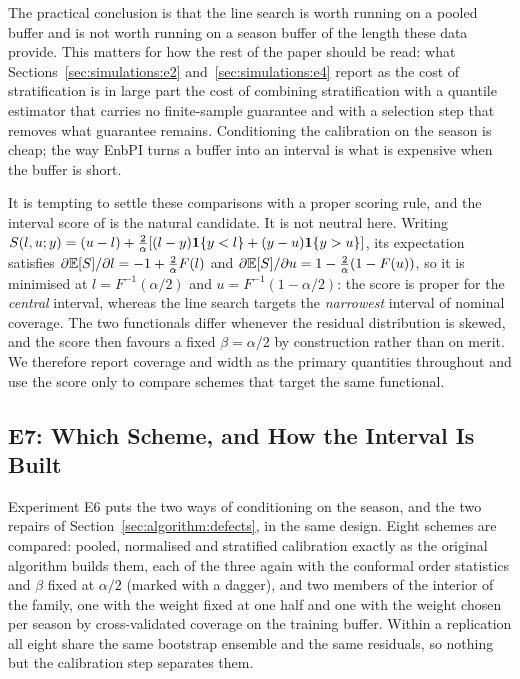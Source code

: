 The practical conclusion is that the line search is worth running on a
pooled buffer and is not worth running on a season buffer of the length
these data provide.  This matters for how the rest of the paper should be
read: what Sections~\ref{sec:simulations:e2} and~\ref{sec:simulations:e4}
report as the cost of stratification is in large part the cost of
combining stratification with a quantile estimator that carries no
finite-sample guarantee and with a selection step that removes what
guarantee remains.  Conditioning the calibration on the season is cheap;
the way EnbPI turns a buffer into an interval is what is expensive when
the buffer is short.

\begin{remark}
\label{rem:winkler}
It is tempting to settle these comparisons with a proper scoring rule, and
the interval score of \citet{winkler1972decision} is the natural
candidate.  It is not neutral here.  Writing
$S(l,u;y) = (u-l) + \tfrac{2}{\alpha}[(l-y)\mathbf{1}\!\left\{y<l\right\} + (y-u)\mathbf{1}\!\left\{y>u\right\}]$,
its expectation satisfies $\partial \mathbb{E}[S]/\partial l = -1 +
\tfrac{2}{\alpha}F(l)$ and $\partial \mathbb{E}[S]/\partial u = 1 -
\tfrac{2}{\alpha}(1-F(u))$, so it is minimised at
$l = F^{-1}(\alpha/2)$ and $u = F^{-1}(1-\alpha/2)$: the score is proper
for the \emph{central} interval, whereas the line search targets the
\emph{narrowest} interval of nominal coverage.  The two functionals differ
whenever the residual distribution is skewed, and the score then favours a
fixed $\beta = \alpha/2$ by construction rather than on merit.  We
therefore report coverage and width as the primary quantities throughout
and use the score only to compare schemes that target the same functional.
\end{remark}

\subsection{E7: Which Scheme, and How the Interval Is Built}
\label{sec:simulations:e7schemes}

Experiment E6 puts the two ways of conditioning on the season, and the
two repairs of Section~\ref{sec:algorithm:defects}, in the same design.
Eight schemes are compared: pooled, normalised and stratified
calibration exactly as the original algorithm builds them, each of the
three again with the conformal order statistics and $\beta$ fixed at
$\alpha/2$ (marked with a dagger), and two members of the interior of the
family, one with the weight fixed at one half and one with the weight
chosen per season by cross-validated coverage on the training buffer.
Within a replication all eight share the same bootstrap ensemble and the
same residuals, so nothing but the calibration step separates them.


